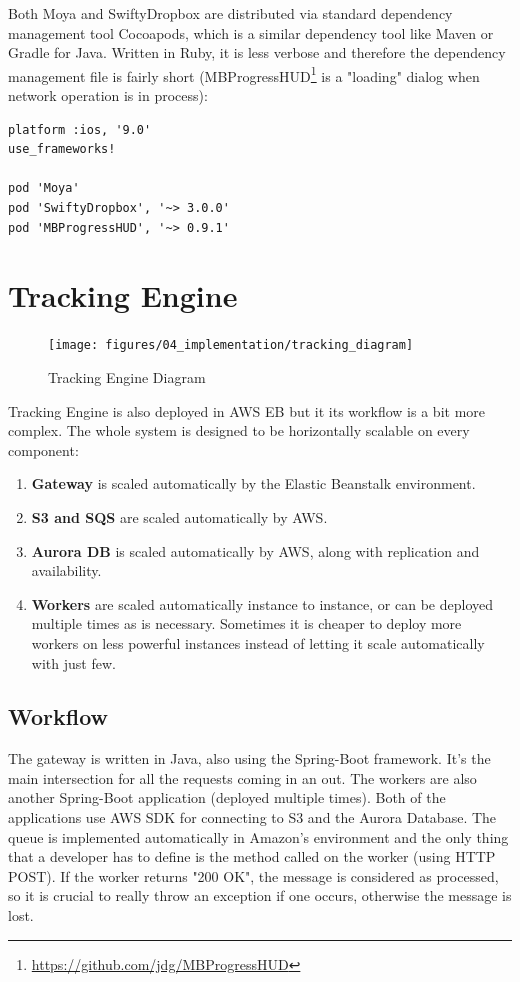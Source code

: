 \bigbreak

Both Moya and SwiftyDropbox are distributed via standard dependency management tool Cocoapods, which is a similar dependency tool like Maven or Gradle for Java. Written in Ruby, it is less verbose and therefore the dependency management file is fairly short (MBProgressHUD\footnote{\url{https://github.com/jdg/MBProgressHUD}} is a "loading" dialog when network operation is in process):

\bigbreak

\begin{lstlisting}
platform :ios, '9.0'
use_frameworks!

pod 'Moya'
pod 'SwiftyDropbox', '~> 3.0.0'
pod 'MBProgressHUD', '~> 0.9.1'
\end{lstlisting}

\newpage
\section{Tracking Engine}

\begin{figure}[!ht]
	\centering
	\texttt{[image: figures/04\_implementation/tracking\_diagram]}
    \caption{Tracking Engine Diagram}
\end{figure}

Tracking Engine is also deployed in AWS EB but it its workflow is a bit more complex. The whole system is designed to be horizontally scalable on every component:

\begin{enumerate}
	\item {\bf Gateway} is scaled automatically by the Elastic Beanstalk environment.
	\item {\bf S3 and SQS} are scaled automatically by AWS.
	\item {\bf Aurora DB} is scaled automatically by AWS, along with replication and availability.
	\item {\bf Workers} are scaled automatically instance to instance, or can be deployed multiple times as is necessary. Sometimes it is cheaper to deploy more workers on less powerful instances instead of letting it scale automatically with just few.
\end{enumerate}

\subsection{Workflow}

The gateway is written in Java, also using the Spring-Boot framework. It's the main intersection for all the requests coming in an out. The workers are also another Spring-Boot application (deployed multiple times). Both of the applications use AWS SDK for connecting to S3 and the Aurora Database. The queue is implemented automatically in Amazon's environment and the only thing that a developer has to define is the method called on the worker (using HTTP POST). If the worker returns "200 OK", the message is considered as processed, so it is crucial to really throw an exception if one occurs, otherwise the message is lost.

